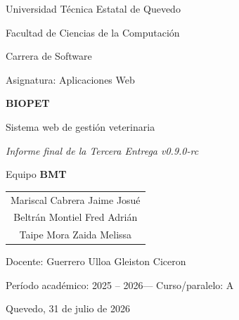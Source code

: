 \documentclass[12pt,a4paper]{report}
\newcommand{\universidad}{Universidad T\'ecnica Estatal de Quevedo}
\newcommand{\facultad}{Facultad de Ciencias de la Computaci\'on}
\newcommand{\carrera}{Carrera de Software}
\newcommand{\asignatura}{Aplicaciones Web}
\newcommand{\docente}{Guerrero Ulloa Gleiston Ciceron}
\newcommand{\periodoacademico}{2025 -- 2026}
\newcommand{\cursoparalelo}{A}
\newcommand{\equipo}{BMT}
\newcommand{\ciudadfecha}{Quevedo, 31 de julio de 2026}
\begin{document}
\begin{titlepage}
  \centering
  \vspace*{0.5cm}

  {\large \universidad \par}
  {\large \facultad \par}
  \vspace{0.3cm}
  {\normalsize \carrera \par}
  {\normalsize Asignatura: \asignatura \par}

  \vspace{2.2cm}
  {\Huge \bfseries BIOPET \par}
  \vspace{0.4cm}
  {\Large Sistema web de gesti\'on veterinaria \par}
  \vspace{0.6cm}
  {\Large\itshape Informe final de la Tercera Entrega v0.9.0-rc \par}

  \vspace{2.0cm}
  {\large Equipo \textbf{\equipo} \par}
  \vspace{0.6cm}

  {\normalsize
    \begin{tabular}{c}
      Mariscal Cabrera Jaime Josu\'e \\
      Beltr\'an Montiel Fred Adri\'an \\
      Taipe Mora Zaida Melissa \\
    \end{tabular}
    \par
  }

  \vspace{2.2cm}
  {\normalsize Docente: \docente \par}
  \vspace{0.3cm}
  {\normalsize Per\'iodo acad\'emico: \periodoacademico \quad --- \quad Curso/paralelo: \cursoparalelo \par}

  \vfill

  {\normalsize \ciudadfecha \par}
  \vspace{0.5cm}

\end{titlepage}
\end{document}
